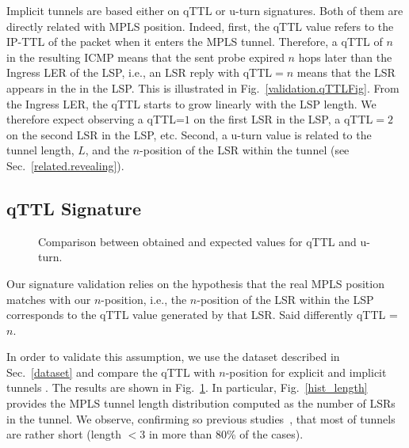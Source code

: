 Implicit tunnels are based either on qTTL or u-turn signatures. Both of them are
directly related with MPLS position.  Indeed, first, the qTTL value refers to
the IP-TTL of the \echorequest packet when it enters the MPLS tunnel. 
Therefore, a qTTL of $n$ in the resulting ICMP \ttlexceeded means that the sent
probe expired $n$ hops later than the Ingress LER of the LSP, i.e., an LSR reply
with qTTL$=n$ means that the LSR appears in the  in the LSP. 
This is illustrated in Fig.~\ref{validation.qTTLFig}.  From the Ingress LER, the
qTTL starts to grow linearly with the LSP length.  We therefore expect observing
a qTTL=$1$ on the first LSR in the LSP, a qTTL$=2$ on the second LSR in the LSP,
etc.  Second, a u-turn value is related to the tunnel length, $L$, and the
$n$-position of the LSR within the tunnel (see Sec.~\ref{related.revealing}).

\subsection{qTTL Signature}\label{validation.qttl}
\begin{figure}[!t]
  \begin{center}
\hspace{-0.3cm}      
  \end{center}
  \caption{Comparison between obtained and expected values for qTTL and u-turn.}
  \label{validation.qttl.fig}
\end{figure}

Our signature validation relies on the hypothesis that the real MPLS position matches
with our $n$-position, i.e., the $n$-position of the LSR within the LSP corresponds 
to the qTTL value generated by that LSR. 
Said differently qTTL = $n$.

In order to validate this assumption, we use the dataset described in
Sec.~\ref{dataset} and compare the qTTL with $n$-position for explicit and implicit tunnels . The results are shown in Fig.~\ref{validation.qttl.fig}.  In
particular, Fig.~\ref{hist_length} provides the MPLS tunnel length distribution
computed as the number of LSRs in the tunnel.  We observe, confirming so
previous studies~\cite{SOM11,Vanaubel15,Donnet12}, that most of tunnels are
rather short (length $< 3$ in more than 80\% of the cases). 

